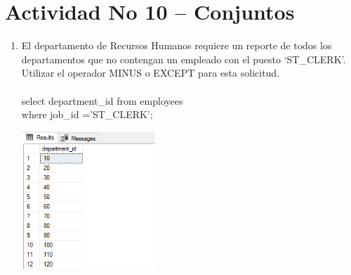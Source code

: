 \section{Actividad No 10 – Conjuntos} 
		


\begin{enumerate}[1.]
	\item El departamento de Recursos Humanos requiere un reporte de todos los departamentos que no contengan un empleado con el puesto ‘ST\_CLERK’. Utilizar el operador MINUS o EXCEPT para esta solicitud.
	\\
	\\select department\_id from employees
	\\where job\_id ='ST\_CLERK';
	\begin{center}
	\includegraphics[width=5cm]{./Imagenes/ejercicio10-1} 
	\end{center}


\end{enumerate}
